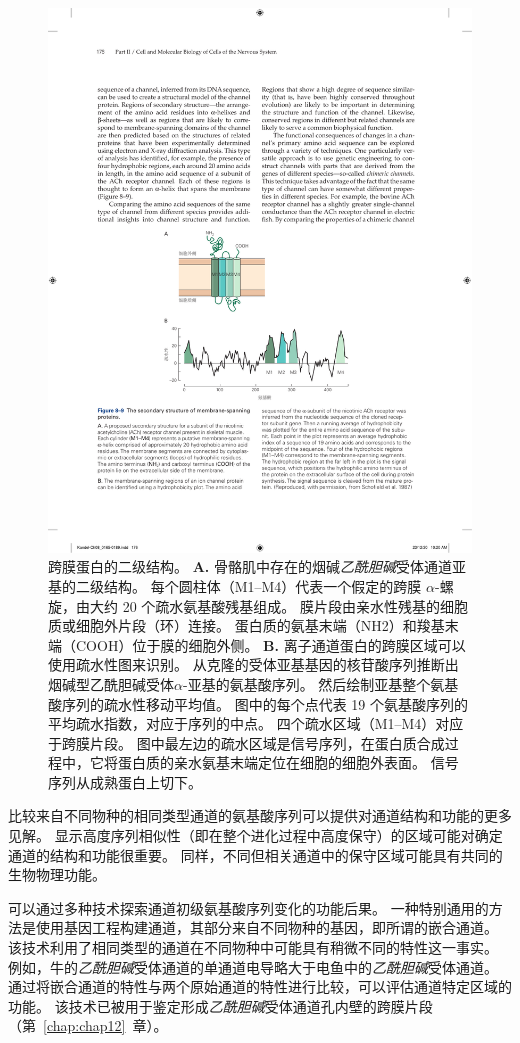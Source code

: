 \begin{figure}[htbp]
	\centering
	\includegraphics[width=0.8\linewidth]{chap08/fig_8_9}
	\caption{跨膜蛋白的二级结构。
		\textbf{A.} 骨骼肌中存在的烟碱\textit{乙酰胆碱}受体通道亚基的二级结构。
		每个圆柱体（M1–M4）代表一个假定的跨膜 $\alpha$-螺旋，由大约 20 个疏水氨基酸残基组成。
		膜片段由亲水性残基的细胞质或细胞外片段（环）连接。
		蛋白质的氨基末端（NH2）和羧基末端（COOH）位于膜的细胞外侧。
		\textbf{B.} 离子通道蛋白的跨膜区域可以使用疏水性图来识别。
		从克隆的受体亚基基因的核苷酸序列推断出烟碱型乙酰胆碱受体$\alpha$-亚基的氨基酸序列。
		然后绘制亚基整个氨基酸序列的疏水性移动平均值。
		图中的每个点代表 19 个氨基酸序列的平均疏水指数，对应于序列的中点。
		四个疏水区域（M1–M4）对应于跨膜片段。
		图中最左边的疏水区域是信号序列，在蛋白质合成过程中，它将蛋白质的亲水氨基末端定位在细胞的细胞外表面。
		信号序列从成熟蛋白上切下\cite{schofield1987sequence}。}
	\label{fig:8_9}
\end{figure}


比较来自不同物种的相同类型通道的氨基酸序列可以提供对通道结构和功能的更多见解。
显示高度序列相似性（即在整个进化过程中高度保守）的区域可能对确定通道的结构和功能很重要。
同样，不同但相关通道中的保守区域可能具有共同的生物物理功能。


可以通过多种技术探索通道初级氨基酸序列变化的功能后果。
一种特别通用的方法是使用基因工程构建通道，其部分来自不同物种的基因，即所谓的嵌合通道。
该技术利用了相同类型的通道在不同物种中可能具有稍微不同的特性这一事实。
例如，牛的\textit{乙酰胆碱}受体通道的单通道电导略大于电鱼中的\textit{乙酰胆碱}受体通道。
通过将嵌合通道的特性与两个原始通道的特性进行比较，可以评估通道特定区域的功能。
该技术已被用于鉴定形成\textit{乙酰胆碱}受体通道孔内壁的跨膜片段（第~\ref{chap:chap12}~章）。


